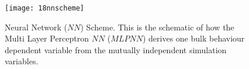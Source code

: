 \begin{figure}[!htb] 
\centering 
\texttt{[image: 18nnscheme]} 
\caption[NN Scheme]{Neural Network ($NN$) Scheme. This is the schematic of how
the Multi Layer Perceptron $NN$ ($MLPNN$) derives one bulk behaviour
dependent variable from the mutually independent simulation variables.}
\label{fig:18nnscheme} 
\end{figure}


